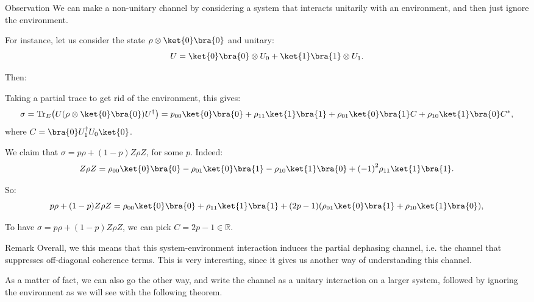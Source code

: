 \documentclass[a4paper]{article}
\begin{document}
\begin{parag}{Observation}
    We can make a non-unitary channel by considering a system that interacts unitarily with an environment, and then just ignore the environment.

    For instance, let us consider the state $\rho \otimes \ket{0}\bra{0}$ and unitary: 
    \[U = \ket{0}\bra{0} \otimes U_0 + \ket{1}\bra{1} \otimes U_1.\]

    Then: 

    Taking a partial trace to get rid of the environment, this gives: 
    \[\sigma = \Tr_E\left(U \left(\rho \otimes \ket{0}\bra{0}\right)U^{\dagger}\right) = p_{00} \ket{0}\bra{0} + \rho_{11} \ket{1}\bra{1} + \rho_{01} \ket{0}\bra{1} C + \rho_{10} \ket{1}\bra{0} C^*,\]
    where $C = \bra{0} U_1^{\dagger} U_0 \ket{0}$.
    
    We claim that $\sigma = p \rho + \left(1-p\right) Z \rho Z$, for some $p$. Indeed: 
    \[Z \rho Z = \rho_{00} \ket{0}\bra{0} - \rho_{01} \ket{0}\bra{1} - \rho_{10} \ket{1}\bra{0} + \left(-1\right)^2 \rho_{11} \ket{1}\bra{1}.\]

    So: 
    \[p \rho + \left(1 - p\right) Z \rho Z = \rho_{00} \ket{0}\bra{0} + \rho_{11} \ket{1}\bra{1} + \left(2p - 1\right)\left(\rho_{01} \ket{0}\bra{1} + \rho_{10}\ket{1}\bra{0}\right),\]
    
    To have $\sigma = p \rho + \left(1 -p \right) Z \rho Z$, we can pick $C = 2p-1 \in \mathbb{R}$.

    \begin{subparag}{Remark}
        Overall, we this means that this system-environment interaction induces the partial dephasing channel, i.e. the channel that suppresses off-diagonal coherence terms. This is very interesting, since it gives us another way of understanding this channel.

        As a matter of fact, we can also go the other way, and write the channel as a unitary interaction on a larger system, followed by ignoring the environnent as we will see with the following theorem.
        
    \end{subparag}
\end{parag}
\end{document}
